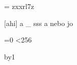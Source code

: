 \documentclass{article}
\begin{document}
\font\x= zxxrl7z%

[ahi] a \_ sss  a  nebo  jo 


=0
\loop
\ifnum{}<256
\the{}\ \bgroup\x\char{}\egroup\par
\advance{} by1\relax
\repeat
\end{document}
